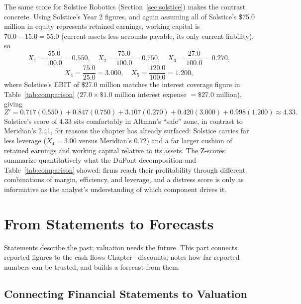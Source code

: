 \documentclass[../ai_in_finance]{subfiles}
\begin{document}
The same score for Solstice Robotics (Section~\ref{sec:solstice}) makes the contrast concrete. Using Solstice's Year 2 figures, and again assuming all of Solstice's \$75.0 million in equity represents retained earnings, working capital is $70.0 - 15.0 = 55.0$ (current assets less accounts payable, its only current liability), so
\begin{equation*}
X_1 = \frac{55.0}{100.0} = 0.550, \quad X_2 = \frac{75.0}{100.0} = 0.750, \quad X_3 = \frac{27.0}{100.0} = 0.270,
\end{equation*}
\begin{equation*}
X_4 = \frac{75.0}{25.0} = 3.000, \quad X_5 = \frac{120.0}{100.0} = 1.200,
\end{equation*}
where Solstice's EBIT of \$27.0 million matches the interest coverage figure in Table~\ref{tab:comparison} ($27.0 \times \$1.0$ million interest expense $= \$27.0$ million), giving
\begin{equation*}
Z' = 0.717(0.550) + 0.847(0.750) + 3.107(0.270) + 0.420(3.000) + 0.998(1.200) \approx 4.33.
\end{equation*}
Solstice's score of 4.33 sits comfortably in Altman's ``safe'' zone, in contrast to Meridian's 2.41, for reasons the chapter has already surfaced: Solstice carries far less leverage ($X_4 = 3.00$ versus Meridian's 0.72) and a far larger cushion of retained earnings and working capital relative to its assets. The Z-scores summarize quantitatively what the DuPont decomposition and Table~\ref{tab:comparison} showed: firms reach their profitability through different combinations of margin, efficiency, and leverage, and a distress score is only as informative as the analyst's understanding of which component drives it.

\section{From Statements to Forecasts}

Statements describe the past; valuation needs the future. This part connects reported figures to the cash flows Chapter~ discounts, notes how far reported numbers can be trusted, and builds a forecast from them.

\subsection{Connecting Financial Statements to Valuation}
\label{sec:valuation-connection}
\end{document}
